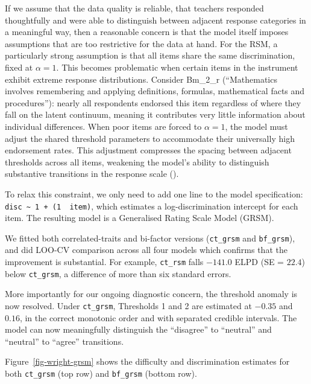 \documentclass[
  man,
  floatsintext,
  longtable,
  nolmodern,
  notxfonts,
  notimes,
  colorlinks=true,linkcolor=blue,citecolor=blue,urlcolor=blue]{apa7}
\begin{document}
If we assume that the data quality is reliable, that teachers responded
thoughtfully and were able to distinguish between adjacent response
categories in a meaningful way, then a reasonable concern is that the
model itself imposes assumptions that are too restrictive for the data
at hand. For the RSM, a particularly strong assumption is that all items
share the same discrimination, fixed at \(\alpha = 1\). This becomes
problematic when certain items in the instrument exhibit extreme
response distributions. Consider Bm\_2\_r (``Mathematics involves
remembering and applying definitions, formulas, mathematical facts and
procedures''): nearly all respondents endorsed this item regardless of
where they fall on the latent continuum, meaning it contributes very
little information about individual differences. When poor items are
forced to \(\alpha = 1\), the model must adjust the shared threshold
parameters to accommodate their universally high endorsement rates. This
adjustment compresses the spacing between adjacent thresholds across all
items, weakening the model's ability to distinguish substantive
transitions in the response scale
().

To relax this constraint, we only need to add one line to the model
specification:
\texttt{disc\ \textasciitilde{}\ 1\ +\ (1\ \textbar{}\ item)}, which
estimates a log-discrimination intercept for each item. The resulting
model is a Generalised Rating Scale Model (GRSM).

We fitted both correlated-traits and bi-factor versions
(\texttt{ct\_grsm} and \texttt{bf\_grsm}), and did LOO-CV comparison
across all four models which confirms that the improvement is
substantial. For example, \texttt{ct\_rsm} falls \(-141.0\) ELPD (SE =
\(22.4\)) below \texttt{ct\_grsm}, a difference of more than six
standard errors.

More importantly for our ongoing diagnostic concern, the threshold
anomaly is now resolved. Under \texttt{ct\_grsm}, Thresholds 1 and 2 are
estimated at \(-0.35\) and \(0.16\), in the correct monotonic order and
with separated credible intervals. The model can now meaningfully
distinguish the ``disagree'' to ``neutral'' and ``neutral'' to ``agree''
transitions.

Figure~\ref{fig-wright-grsm} shows the difficulty and discrimination
estimates for both \texttt{ct\_grsm} (top row) and \texttt{bf\_grsm}
(bottom row).
\end{document}
